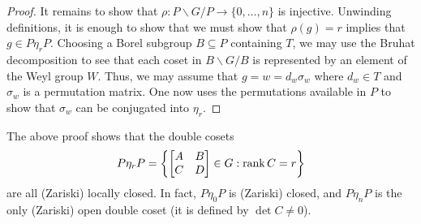 \begin{proof}
    It remains to show that $\rho\colon P\backslash G/P\to\{0,
    \ldots,n\}$ is injective. Unwinding definitions, it is enough to show that we must show that $\rho(g)=r$ implies that $g\in P\eta_rP$. Choosing a Borel subgroup $B\subseteq P$ containing $T$, we may use the Bruhat decomposition to see that each coset in $B\backslash G/B$ is represented by an element of the Weyl group $W$. Thus, we may assume that $g=w=d_w\sigma_w$ where $d_w\in T$ and $\sigma_w$ is a permutation matrix. One now uses the permutations available in $P$ to show that $\sigma_w$ can be conjugated into $\eta_r$.
\end{proof}
\begin{remark}
    The above proof shows that the double cosets
    \[P\eta_rP=\left\{\begin{bmatrix}
        A & B \\ C & D
    \end{bmatrix}\in G:\operatorname{rank}C=r\right\}\]
    are all (Zariski) locally closed. In fact, $P\eta_0P$ is (Zariski) closed, and $P\eta_nP$ is the only (Zariski) open double coset (it is defined by $\det C\ne0$).
\end{remark}


